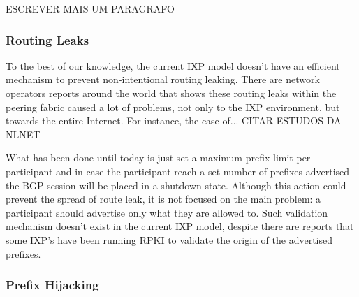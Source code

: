 \documentclass[12pt]{article}
\begin{document}
ESCREVER MAIS UM PARAGRAFO

\subsubsection{Routing Leaks}
\label{subsub:routingleak}

To the best of our knowledge, the current IXP model doesn't have an efficient mechanism to prevent non-intentional routing leaking. There are network operators reports around the world that shows these routing leaks within the peering fabric caused a lot of problems, not only to the IXP environment, but towards the entire Internet. For instance, the case of... CITAR ESTUDOS DA NLNET

What has been done until today is just set a maximum prefix-limit per participant and in case the participant reach a set number of prefixes advertised the BGP session will be placed in a shutdown state. Although this action could prevent the spread of route leak, it is not focused on the main problem: a participant should advertise only what they are allowed to. Such validation mechanism doesn't exist in the current IXP model, despite there are reports that some IXP's have been running RPKI to validate the origin of the advertised prefixes.


\subsubsection{Prefix Hijacking}
\end{document}
